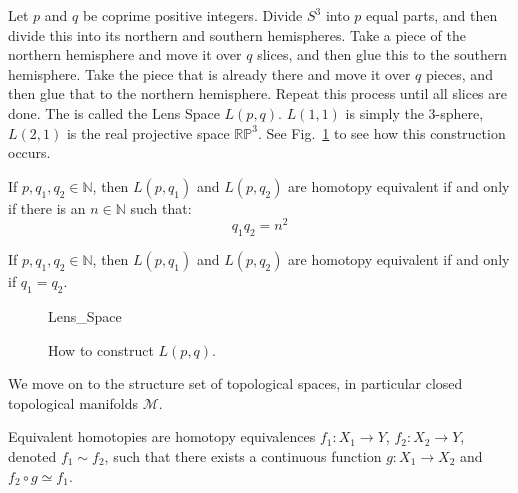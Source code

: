\documentclass[crop=false,class=book,oneside]{standalone}
\begin{document}
            Let $p$ and $q$ be coprime positive integers.
            Divide $S^{3}$ into $p$ equal parts, and then divide
            this into its northern and southern hemispheres.
            Take a piece of the northern hemisphere and move
            it over $q$ slices, and then glue this to the
            southern hemisphere. Take the piece that is already
            there and move it over $q$ pieces, and then glue
            that to the northern hemisphere. Repeat this
            process until all slices are done. The is called
            the Lens Space $L(p,q)$. $L(1,1)$ is simply the
            3-sphere, $L(2,1)$ is the real projective space
            $\mathbb{RP}^{3}$.
            See Fig.~\ref{fig:surgery_theory_lens_space_drawing}
            to see how this construction occurs.
            \begin{theorem}
                If $p,q_{1},q_{2}\in\mathbb{N}$, then $L(p,q_{1})$ and
                $L(p,q_{2})$ are homotopy equivalent if and only if there
                is an $n\in\mathbb{N}$ such that:
                \begin{equation}
                    q_{1}q_{2}=n^{2}
                \end{equation}
            \end{theorem}
            \begin{theorem}
                If $p,q_{1},q_{2}\in\mathbb{N}$, then $L(p,q_{1})$ and
                $L(p,q_{2})$ are homotopy equivalent if and only if
                $q_{1}=q_{2}$.
            \end{theorem}
            \begin{figure}[H]
                \centering
                \captionsetup{type=figure}
                {Lens_Space}
                \caption{How to construct $L(p,q)$.}
                \label{fig:surgery_theory_lens_space_drawing}
            \end{figure}
            We move on to the structure set of topological spaces,
            in particular closed topological
            manifolds $\mathcal{M}$.
            \begin{definition}
                Equivalent homotopies are homotopy equivalences
                $f_{1}:X_{1}\rightarrow Y$,
                $f_{2}:X_{2}\rightarrow Y$,
                denoted $f_{1}\sim{f_{2}}$, such that there
                exists a continuous function
                $g:X_{1}\rightarrow{X_{2}}$ and
                $f_{2}\circ{g}\simeq{f_{1}}$.
            \end{definition}
\end{document}
